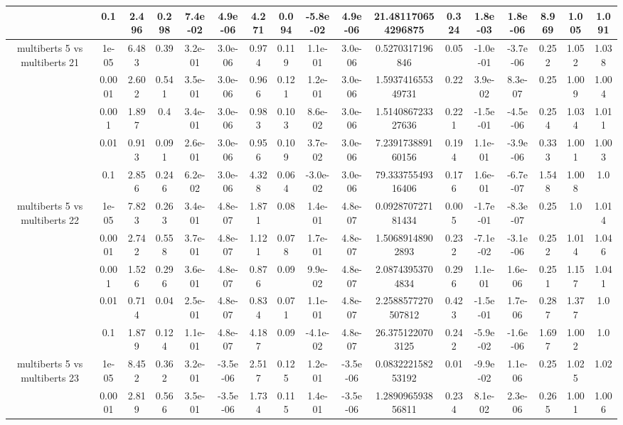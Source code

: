 \begin{tabular}{|c|c|c|c|c|c|c|c|c|c|c|c|c|c|c|c|c|}
 & 0.1 & 2.496 & 0.298 & 7.4e-02 & 4.9e-06 & 4.271 & 0.094 & -5.8e-02 & 4.9e-06 & 21.481170654296875 & 0.324 & 1.8e-03 & 1.8e-06 & 8.969 & 1.005 & 1.091 \\
\hline
\multirow{5}{*}{multiberts 5 vs multiberts 21} & 1e-05 & 6.483 & 0.39 & 3.2e-01 & 3.0e-06 & 0.974 & 0.119 & 1.1e-01 & 3.0e-06 & 0.5270317196846 & 0.05 & -1.0e-01 & -3.7e-06 & 0.252 & 1.052 & 1.038 \\
 & 0.0001 & 2.602 & 0.541 & 3.5e-01 & 3.0e-06 & 0.966 & 0.121 & 1.2e-01 & 3.0e-06 & 1.593741655349731 & 0.22 & 3.9e-02 & 8.3e-07 & 0.25 & 1.009 & 1.004 \\
 & 0.001 & 1.897 & 0.4 & 3.4e-01 & 3.0e-06 & 0.983 & 0.103 & 8.6e-02 & 3.0e-06 & 1.514086723327636 & 0.221 & -1.5e-01 & -4.5e-06 & 0.254 & 1.034 & 1.011 \\
 & 0.01 & 0.913 & 0.091 & 2.6e-01 & 3.0e-06 & 0.956 & 0.109 & 3.7e-02 & 3.0e-06 & 7.239173889160156 & 0.194 & 1.1e-01 & -3.9e-06 & 0.333 & 1.001 & 1.003 \\
 & 0.1 & 2.856 & 0.246 & 6.2e-02 & 3.0e-06 & 4.328 & 0.064 & -3.0e-02 & 3.0e-06 & 79.33375549316406 & 0.176 & 1.6e-01 & -6.7e-07 & 1.548 & 1.008 & 1.0 \\
\hline
\multirow{5}{*}{multiberts 5 vs multiberts 22} & 1e-05 & 7.823 & 0.263 & 3.4e-01 & 4.8e-07 & 1.871 & 0.08 & 1.4e-01 & 4.8e-07 & 0.092870727181434 & 0.005 & -1.7e-01 & -8.3e-07 & 0.25 & 1.0 & 1.014 \\
 & 0.0001 & 2.742 & 0.558 & 3.7e-01 & 4.8e-07 & 1.121 & 0.078 & 1.7e-01 & 4.8e-07 & 1.50689148902893 & 0.232 & -7.1e-02 & -3.1e-06 & 0.252 & 1.014 & 1.046 \\
 & 0.001 & 1.526 & 0.296 & 3.6e-01 & 4.8e-07 & 0.876 & 0.09 & 9.9e-02 & 4.8e-07 & 2.08743953704834 & 0.296 & 1.1e-01 & 1.6e-06 & 0.251 & 1.157 & 1.041 \\
 & 0.01 & 0.714 & 0.04 & 2.5e-01 & 4.8e-07 & 0.834 & 0.071 & 1.1e-01 & 4.8e-07 & 2.2588577270507812 & 0.423 & -1.5e-01 & 1.7e-06 & 0.287 & 1.377 & 1.0 \\
 & 0.1 & 1.879 & 0.124 & 1.1e-01 & 4.8e-07 & 4.187 & 0.09 & -4.1e-02 & 4.8e-07 & 26.3751220703125 & 0.242 & -5.9e-02 & -1.6e-06 & 1.697 & 1.002 & 1.0 \\
\hline
\multirow{5}{*}{multiberts 5 vs multiberts 23} & 1e-05 & 8.452 & 0.362 & 3.2e-01 & -3.5e-06 & 2.517 & 0.125 & 1.2e-01 & -3.5e-06 & 0.083222158253192 & 0.01 & -9.9e-02 & 1.1e-06 & 0.25 & 1.025 & 1.02 \\
 & 0.0001 & 2.819 & 0.566 & 3.5e-01 & -3.5e-06 & 1.734 & 0.115 & 1.4e-01 & -3.5e-06 & 1.289096593856811 & 0.234 & 8.1e-02 & 2.3e-06 & 0.265 & 1.001 & 1.006 \\

\end{tabular}
